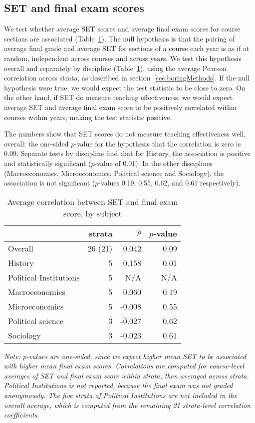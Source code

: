 \documentclass[12pt]{article}
\begin{document}
\subsection{SET and final exam scores} \label{sec:Fr-set-final}
We test whether average SET scores and average final exam scores for course
sections are associated (Table~\ref{tab:finalexam}). 
The null hypothesis is that the pairing
of average final grade and average SET for sections of a course each year is as if at random,
independent across courses and across years.
We test this hypothesis overall and separately by discipline 
(Table~\ref{tab:finalexam}), using the average Pearson correlation across strata, as described 
in section~\ref{sec:boringMethods}.
If the null hypothesis were true, we would expect the test statistic to be 
close to zero.
On the other hand, if SET do measure teaching effectiveness, we would expect average
SET and average final exam score to be positively correlated within courses within years, 
making the test statistic positive. 

The numbers show that SET scores do not measure teaching effectiveness well, overall:
the one-sided $p$-value for the hypothesis that the correlation is zero is 0.09.
Separate tests by discipline find that for History, the 
association is positive and statistically
significant ($p$-value of 0.01). 
In the other disciplines (Macroeconomics, Microeconomics, Political science and Sociology), the association is not significant ($p$-values 0.19, 0.55, 0.62, and 0.61 respectively). 

\begin{table}[htbp]
  \centering
  \footnotesize 
  \caption{Average correlation between SET and final exam score, by subject}
    \begin{tabular}{lrrr}
    \toprule 
                        & strata & $\bar{\rho}$  & $p$-value  \\
   \midrule
    Overall &        26 (21) &     0.042 &       0.09  \\
    History &         5 &    0.158 &       0.01  \\
    Political Institutions & 5 & N/A & N/A \\
    Macroeconomics &  5 &    0.060 &       0.19  \\
    Microeconomics &   5 &   -0.008 &       0.55  \\
    Political science & 3 &  -0.027 &       0.62  \\
    Sociology &      3 &    -0.023 &       0.61  \\
    \bottomrule
    \end{tabular}%
 \label{tab:finalexam}%
 
\textit{Note: $p$-values are one-sided, since we expect higher mean SET to be associated
with higher mean final exam scores.
Correlations are computed for course-level averages of SET and final exam score
within strata, then averaged across strata.
Political Institutions is not reported, because the final exam was not graded anonymously.
The five strata of Political Institutions are not included in the overall average,
which is computed from the remaining 21 strata-level correlation coefficients.}
\end{table}%
\normalsize
\end{document}

